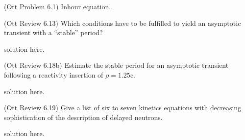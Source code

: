 \documentclass[11pt,addpoints,answers]{exam}
\begin{document}
\begin{questions}
        \question (Ott Problem 6.1) Inhour equation.

        \question[5] (Ott Review 6.13) Which conditions have to be fulfilled to 
        yield an asymptotic transient with a ``stable'' period?
        \begin{solution}
                solution here.
        \end{solution}

        
        \question[10] (Ott Review 6.18b) Estimate the stable period for an 
        asymptotic transient following a reactivity insertion of $\rho = 
        1.25\cent$.
        \begin{solution}
                solution here.
        \end{solution}


        \question[10] (Ott Review 6.19) Give a list of six to seven 
        kinetics equations with decreasing sophistication of the description of 
        delayed neutrons.
        \begin{solution}
                solution here.
        \end{solution}
        
\end{questions}



%
%
\end{document}
